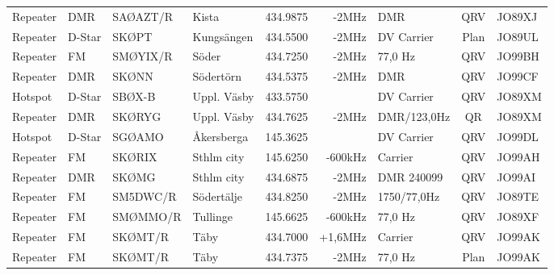 \begin{landscape}
\begin{longtable}{llllrrlcl}
	Repeater           & DMR          & SAØAZT/R      & Kista        &          434.9875 &          -2MHz & DMR             &       QRV       & JO89XJ           \\
	Repeater           & D-Star       & SKØPT         & Kungsängen   &          434.5500 &          -2MHz & DV Carrier      &      Plan       & JO89UL           \\
	Repeater           & FM           & SMØYIX/R      & Söder        &          434.7250 &          -2MHz & 77,0 Hz         &       QRV       & JO99BH           \\
	Repeater           & DMR          & SKØNN         & Södertörn    &          434.5375 &          -2MHz & DMR             &       QRV       & JO99CF           \\
	Hotspot            & D-Star       & SBØX-B        & Uppl. Väsby  &          433.5750 &                & DV Carrier      &       QRV       & JO89XM           \\
	Repeater           & DMR          & SKØRYG        & Uppl. Väsby  &          434.7625 &          -2MHz & DMR/123,0Hz     &       QR        & JO89XM           \\
	Hotspot            & D-Star       & SGØAMO        & Åkersberga   &          145.3625 &                & DV Carrier      &       QRV       & JO99DL           \\
	Repeater           & FM           & SKØRIX        & Sthlm city   &          145.6250 &        -600kHz & Carrier         &       QRV       & JO99AH           \\
	Repeater           & DMR          & SKØMG         & Sthlm city   &          434.6875 &          -2MHz & DMR 240099      &       QRV       & JO99AI           \\
	Repeater           & FM           & SM5DWC/R      & Södertälje   &          434.8250 &          -2MHz & 1750/77,0Hz     &       QRV       & JO89TE           \\
	Repeater           & FM           & SMØMMO/R      & Tullinge     &          145.6625 &        -600kHz & 77,0 Hz         &       QRV       & JO89XF           \\
	Repeater           & FM           & SKØMT/R       & Täby         &          434.7000 &        +1,6MHz & Carrier         &       QRV       & JO99AK           \\
	Repeater           & FM           & SKØMT/R       & Täby         &          434.7375 &          -2MHz & 77,0 Hz         &      Plan       & JO99AK           \\

\end{longtable}
\end{landscape}
